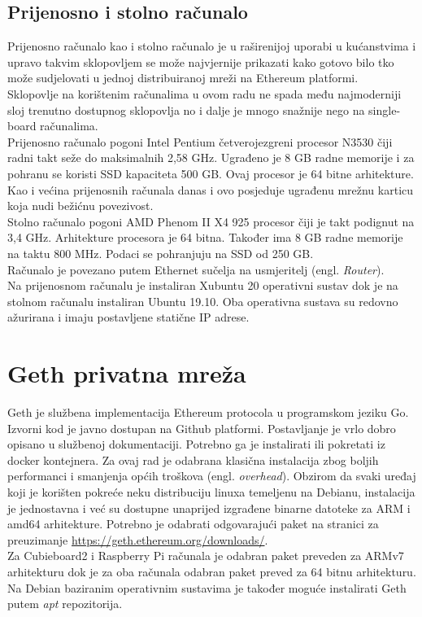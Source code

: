 \documentclass[times, utf8, zavrsni, numeric]{fer}
\begin{document}
\subsection{Prijenosno i stolno računalo}
Prijenosno računalo kao i stolno računalo je u raširenijoj uporabi u kućanstvima i upravo takvim sklopovljem se može
najvjernije prikazati kako gotovo bilo tko može sudjelovati u jednoj distribuiranoj mreži na Ethereum platformi. \\
Sklopovlje na korištenim računalima u ovom radu ne spada među najmoderniji sloj trenutno dostupnog sklopovlja no i dalje
je mnogo snažnije nego na single-board računalima. \\
Prijenosno računalo pogoni Intel Pentium četverojezgreni procesor N3530 čiji radni takt seže do maksimalnih 2,58 GHz.
Ugrađeno je 8 GB radne memorije i za pohranu se koristi SSD kapaciteta 500 GB. Ovaj procesor je 64 bitne arhitekture.
Kao i većina prijenosnih računala danas i ovo posjeduje ugrađenu mrežnu karticu koja nudi bežićnu povezivost. \\
Stolno računalo pogoni AMD Phenom II X4 925 procesor čiji je takt podignut na 3,4 GHz. Arhitekture procesora je 64 bitna.
Također ima 8 GB radne memorije na taktu 800 MHz. Podaci se pohranjuju na SSD od 250 GB. \\
Računalo je povezano putem Ethernet sučelja na usmjeritelj (engl. \emph{Router}). \\
Na prijenosnom računalu je instaliran Xubuntu 20 operativni sustav dok je na stolnom računalu instaliran Ubuntu 19.10.
Oba operativna sustava su redovno ažurirana i imaju postavljene statične IP adrese.
\section{Geth privatna mreža}
Geth je službena implementacija Ethereum protocola u programskom jeziku Go. Izvorni kod je javno dostupan na Github platformi. 
Postavljanje je vrlo dobro opisano u službenoj dokumentaciji. Potrebno ga je instalirati ili pokretati iz docker kontejnera. 
Za ovaj rad je odabrana klasična instalacija zbog boljih performanci i smanjenja općih troškova (engl. \emph{overhead}).
Obzirom da svaki uređaj koji je korišten pokreće neku distribuciju linuxa temeljenu na Debianu, instalacija je jednostavna
i već su dostupne unaprijed izgrađene binarne datoteke za ARM i amd64 arhitekture. Potrebno je odabrati odgovarajući paket na
stranici za preuzimanje \url{https://geth.ethereum.org/downloads/}.\\ Za Cubieboard2 i Raspberry Pi računala je odabran paket
preveden za ARMv7 arhitekturu dok je za oba računala odabran paket preved za 64 bitnu arhitekturu. \\
Na Debian baziranim operativnim sustavima je također moguće instalirati Geth putem \emph{apt} repozitorija. \\
\end{document}
